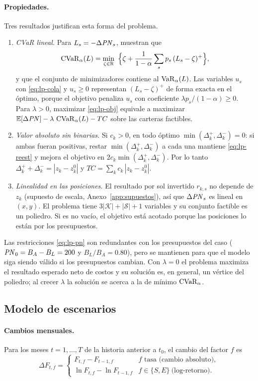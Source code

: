 \paragraph{Propiedades.} Tres resultados justifican esta forma del problema.
\begin{enumerate}
  \item \emph{CVaR lineal.} Para $L_s = -\Delta\mathit{PN}_s$, \textcite{rockafellar2000} muestran que
  \[
    \CVaR_\alpha(L) = \min_{\zeta \in \R}\ \Big\{\zeta + \frac{1}{1-\alpha}\sum_s p_s\,(L_s - \zeta)^+\Big\},
  \]
  y que el conjunto de minimizadores contiene al $\operatorname{VaR}_\alpha(L)$. Las variables $u_s$ con
  \eqref{eq:lp-cola} y $u_s \ge 0$ representan $(L_s - \zeta)^+$ de forma exacta en el óptimo, porque el
  objetivo penaliza $u_s$ con coeficiente $\lambda p_s/(1-\alpha) \ge 0$. Para $\lambda > 0$, maximizar
  \eqref{eq:lp-obj} equivale a maximizar $\mathbb{E}[\Delta\mathit{PN}] - \lambda\,\operatorname{CVaR}_\alpha(L) - TC$ sobre las carteras
  factibles.
  \item \emph{Valor absoluto sin binarias.} Si $c_k > 0$, en todo óptimo $\min(\Delta_k^+, \Delta_k^-) = 0$:
  si ambas fueran positivas, restar $\min(\Delta_k^+, \Delta_k^-)$ a cada una mantiene \eqref{eq:lp-reest} y
  mejora el objetivo en $2 c_k \min(\Delta_k^+, \Delta_k^-)$. Por lo tanto
  $\Delta_k^+ + \Delta_k^- = |z_k - z_k^0|$ y $TC = \sum_k c_k\, |z_k - z_k^0|$.
  \item \emph{Linealidad en las posiciones.} El resultado por sol invertido $r_{k,s}$ no depende de $z_k$
  (supuesto de escala, Anexo~\ref{app:supuestos}), así que $\Delta\mathit{PN}_s$ es lineal en $(x, y)$. El problema tiene
  $3|\mathcal{K}| + |\mathcal{S}| + 1$ variables y su conjunto factible es un poliedro. Si es no vacío, el
  objetivo está acotado porque las posiciones lo están por los presupuestos.
\end{enumerate}
Las restricciones \eqref{eq:lp-pn} son redundantes con los presupuestos del caso
($\mathit{PN}_0 = B_A - B_L = 200$ y $B_L/B_A = 0.80$), pero se mantienen para que el modelo siga siendo válido si
los presupuestos cambian. Con $\lambda = 0$ el problema maximiza el resultado esperado neto de costos y su
solución es, en general, un vértice del poliedro; al crecer $\lambda$ la solución se acerca a la de mínimo
$\operatorname{CVaR}_\alpha$.

\subsection{Modelo de escenarios}\label{app:form-escenarios}
\paragraph{Cambios mensuales.} Para los meses $t = 1, \dots, T$ de la historia anterior a $t_0$, el cambio
del factor $f$ es
\[
  \Delta F_{t,f} = \begin{cases}
    F_{t,f} - F_{t-1,f} & f \text{ tasa (cambio absoluto)},\\
    \ln F_{t,f} - \ln F_{t-1,f} & f \in \{S, E\}\ \text{(log-retorno)}.
  \end{cases}
\]

